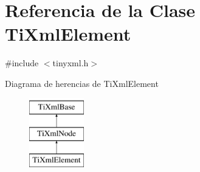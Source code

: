 \hypertarget{classTiXmlElement}{\section{\-Referencia de la \-Clase \-Ti\-Xml\-Element}
\label{classTiXmlElement}
}


{\ttfamily \#include $<$tinyxml.\-h$>$}

\-Diagrama de herencias de \-Ti\-Xml\-Element\begin{figure}[H]
\begin{center}
\leavevmode
\includegraphics[height=3.000000cm]{classTiXmlElement}
\end{center}
\end{figure}
